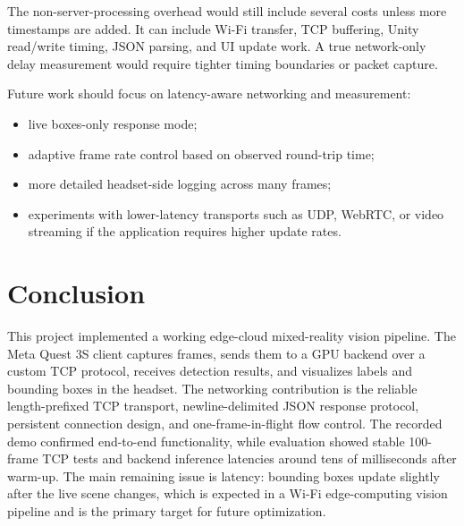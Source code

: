 \documentclass[11pt]{article}
\begin{document}
The non-server-processing overhead would still include several costs unless more timestamps are added. It can include Wi-Fi transfer, TCP buffering, Unity read/write timing, JSON parsing, and UI update work. A true network-only delay measurement would require tighter timing boundaries or packet capture.

Future work should focus on latency-aware networking and measurement:

\begin{itemize}
    \item live boxes-only response mode;
    \item adaptive frame rate control based on observed round-trip time;
    \item more detailed headset-side logging across many frames;
    \item experiments with lower-latency transports such as UDP, WebRTC, or video streaming if the application requires higher update rates.
\end{itemize}

\section{Conclusion}

This project implemented a working edge-cloud mixed-reality vision pipeline. The Meta Quest 3S client captures frames, sends them to a GPU backend over a custom TCP protocol, receives detection results, and visualizes labels and bounding boxes in the headset. The networking contribution is the reliable length-prefixed TCP transport, newline-delimited JSON response protocol, persistent connection design, and one-frame-in-flight flow control. The recorded demo confirmed end-to-end functionality, while evaluation showed stable 100-frame TCP tests and backend inference latencies around tens of milliseconds after warm-up. The main remaining issue is latency: bounding boxes update slightly after the live scene changes, which is expected in a Wi-Fi edge-computing vision pipeline and is the primary target for future optimization.
\end{document}
